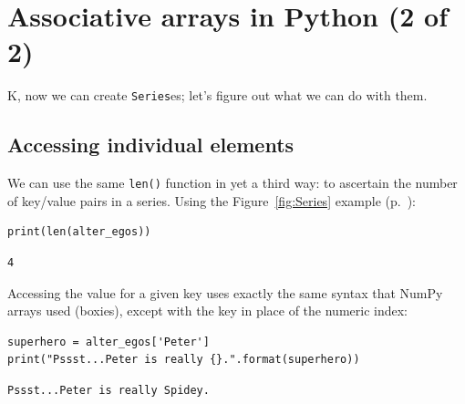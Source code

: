 


\chapter{\huge Associative arrays in Python (2 of 2)}
\label{ch:arraysInPython2}

K, now we can create \texttt{Series}es; let's figure out what we can do with
them.

\section{Accessing individual elements}


We can use the same \texttt{len()} function in yet a third way: to ascertain
the number of key/value pairs in a series. Using the Figure~\ref{fig:Series}
example (p.~\pageref{fig:Series}):

\begin{Verbatim}[fontsize=\small,samepage=true,frame=single,framesep=3mm]
print(len(alter_egos))
\end{Verbatim}

\begin{Verbatim}[fontsize=\small,samepage=true,frame=leftline,framesep=5mm,framerule=1mm]
4
\end{Verbatim}


Accessing the value for a given key uses exactly the same syntax that NumPy
arrays used (boxies), except with the key in place of the numeric index:

\begin{Verbatim}[fontsize=\small,samepage=true,frame=single,framesep=3mm]
superhero = alter_egos['Peter']
print("Pssst...Peter is really {}.".format(superhero))
\end{Verbatim}

\begin{Verbatim}[fontsize=\small,samepage=true,frame=leftline,framesep=5mm,framerule=1mm]
Pssst...Peter is really Spidey.
\end{Verbatim}


